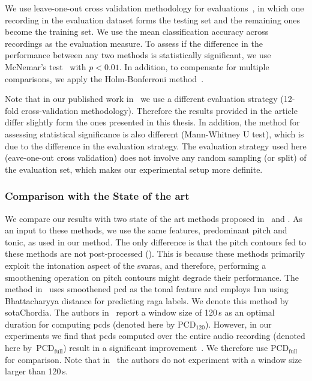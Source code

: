 We use leave-one-out cross validation methodology for evaluations~\citep{Mitchell97BOOK}, in which one recording in the evaluation dataset forms the testing set and the remaining ones become the training set. We use the mean classification accuracy across recordings as the evaluation measure. To assess if the difference in the performance between any two methods is statistically significant, we use McNemar's test~\citep{mcnemar1947note} with $p < 0.01$. In addition, to compensate for multiple comparisons, we apply the Holm-Bonferroni method~\citep{holm1979simple}. 

Note that in our published work in~\cite{gulatiphrase_2016} we use a different evaluation strategy (12-fold cross-validation methodology). Therefore the results provided in the article differ slightly form the ones presented in this thesis. In addition, the method for assessing statistical significance is also different (Mann-Whitney U test), which is due to the difference in the evaluation strategy. The evaluation strategy used here (eave-one-out cross validation) does not involve any random sampling (or split) of the evaluation set, which makes our experimental setup more definite.

\subsubsection{Comparison with the State of the art}
\label{sec:raga_rec_pattern_comparison_sota}

We compare our results with two state of the art methods proposed in~\citep{chordia2013joint} and \citep{koduri2014intonation}. As an input to these methods, we use the same features, predominant pitch and tonic, as used in our method. The only difference is that the pitch contours fed to these methods are not post-processed (). This is because these methods primarily exploit the intonation aspect of the \glspl{svara}, and therefore, performing a smoothening operation on pitch contours might degrade their performance. The method in~\cite{chordia2013joint} uses smoothened \acrfull{pcd} as the tonal feature and employs \acrfull{1nn} using Bhattacharyya distance for predicting \gls{raga} labels. We denote this method by \acrshort{sotaChordia}. The authors in~\cite{chordia2013joint} report a window size of 120\,s as an optimal duration for computing \glspl{pcd} (denoted here by $\mathrm{PCD}_{120}$). However, in our experiments we find that \glspl{pcd} computed over the entire audio recording (denoted here by~$\mathrm{PCD}_\mathrm{full}$) result in a significant improvement~\citep{gulatiphrase_2016}. We therefore use $\mathrm{PCD}_\mathrm{full}$ for comparison. Note that in~\cite{chordia2013joint} the authors do not experiment with a window size larger than 120\,s. 

